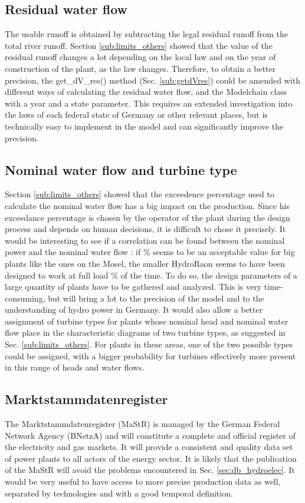 \subsection{Residual water flow}
\label{sub:imp_dVres}
The usable runoff is obtained by subtracting the legal residual runoff from the total river runoff. Section \ref{sub:limits_others} showed that the value of the residual runoff changes a lot depending on the local law and on the year of construction of the plant, as the law changes. Therefore, to obtain a better precision, the get{\_}dV{\_}res() method (Sec. \ref{sub:getdVres}) could be amended with different ways of calculating the residual water flow, and the Modelchain class with a year and a state parameter. \newline
This requires an extended investigation into the laws of each federal state of Germany or other relevant places, but is technically easy to implement in the model and can significantly improve the precision.

\subsection{Nominal water flow and turbine type}
\label{sub:imp_dVn}
Section \ref{sub:limits_others} showed that the exceedence percentage used to calculate the nominal water flow has a big impact on the production. Since his exceedance percentage is chosen by the operator of the plant during the design process and depends on human decisions, it is difficult to chose it precisely. It would be interesting to see if a correlation can be found between the nominal power and the nominal water flow : if \unit[20]{\%} seems to be an acceptable value for big plants like the ones on the Mosel, the smaller HydroRaon seems to have been designed to work at full load \unit[30]{\%} of the time. To do so, the design parameters of a large quantity of plants have to be gathered and analyzed. This is very time-consuming, but will bring a lot to the precision of the model and to the understanding of hydro power in Germany. \newline
It would also allow a better assignment of turbine types for plants whose nominal head and nominal water flow place in the characteristic diagrams of two turbine types, as suggested in Sec. \ref{sub:limits_others}. For plants in these areas, one of the two possible types could be assigned, with a bigger probability for turbines effectively more present in this range of heads and water flows.

\subsection{Marktstammdatenregister}
\label{sub:imp_data}
The Marktstammdatenregister (MaStR) is managed by the German Federal Network Agency (BNetzA) and will constitute a complete and official register of the electricity and gas markets. It will provide a consistent and quality data set of power plants to all actors of the energy sector. It is likely that the publication of the MaStR will avoid the problems encountered in Sec. \ref{sec:db_hydroelec}. It would be very useful to have access to more precise production data as well, separated by technologies and with a good temporal definition.

